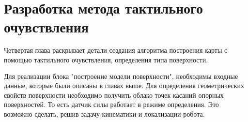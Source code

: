 \chapter{Разработка метода тактильного очувствления}\label{ch:ch4}

Четвертая глава раскрывает детали создания алгоритма построения карты с помощью тактильного очувствления, определения типа поверхности.

Для реализации блока "построение модели поверхности", необходимы входные данные, которые были  описаны в главах выше. Для определения геометрических свойств поверхности необходимо получить облако точек касаний опорных поверхностей. То есть датчик силы работает в режиме определения. Это возможно сделать, решив задачу кинематики и локализации робота.



